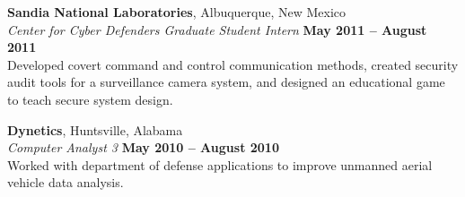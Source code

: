 \documentclass[margin,line]{resume}
\begin{document}
\begin{resume}
    \textbf{Sandia National Laboratories}, Albuquerque, New Mexico \vspace{2mm}\\\vspace{1mm}%
    \textsl{Center for Cyber Defenders Graduate Student Intern} \hfill \textbf{May 2011 -- August 2011}\\
    Developed covert command and control communication methods, created security audit tools for a
    surveillance camera system, and designed an educational game to teach secure system design.
    
    \textbf{Dynetics}, Huntsville, Alabama \vspace{2mm}\\\vspace{1mm}%
    \textsl{Computer Analyst 3} \hfill \textbf{May 2010 -- August 2010}\\
    Worked with department of defense applications to improve unmanned aerial vehicle data analysis. 

    \begin{comment}
    \textbf{AT\&T}, Saint Louis, Missouri \vspace{2mm}\\\vspace{1mm}%
    \textsl{Summer Technical Intern} \hfill \textbf{May 2008 -- August 2008}\\
    Developed automated service detection to ensure all pertinent applications installed on a server
    were restarted at server reboot.  Modernized legacy software performing phone number database queries.
    \end{comment}
    

\end{resume}
\end{document}
